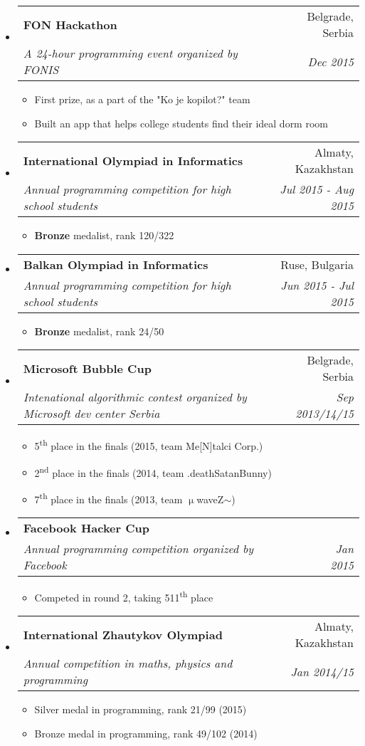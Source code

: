 \documentclass[letterpaper,11pt]{article}
\makeatletter
\newcommand{\resitem}[1]{\item #1 \vspace{-2pt}} %
\newcommand{\ressubheading}[4]{
\begin{tabular*}{6.5in}{l@{\cftdotfill{\cftsecdotsep}\extracolsep{\fill}}r} %
    \textbf{#1} & #2 \\
    \textit{#3} & \textit{#4} \\
\end{tabular*}\vspace{0pt}} %
\makeatother
\begin{document}
\begin{itemize}

\item \ressubheading{FON Hackathon}{Belgrade, Serbia}{A 24-hour programming event organized by FONIS}{Dec 2015}
\begin{itemize}
  \resitem{First prize, as a part of the "Ko je kopilot?" team}
  \resitem{Built an app that helps college students find their ideal dorm room}
\end{itemize}

\item \ressubheading{International Olympiad in Informatics}{Almaty, Kazakhstan}{Annual programming competition for high school students}{Jul 2015 - Aug 2015}
\begin{itemize}
  \resitem{\textbf{Bronze} medalist, rank 120/322}
\end{itemize}

\item \ressubheading{Balkan Olympiad in Informatics}{Ruse, Bulgaria}{Annual programming competition for high school students}{Jun 2015 - Jul 2015}
\begin{itemize}
  \resitem{\textbf{Bronze} medalist, rank 24/50}
\end{itemize}

\item \ressubheading{Microsoft Bubble Cup}{Belgrade, Serbia}{Intenational algorithmic contest organized by Microsoft dev center Serbia}{Sep 2013/14/15}
\begin{itemize}
  \resitem{5\textsuperscript{th} place in the finals (2015, team Me[N]talci Corp.)}
  \resitem{2\textsuperscript{nd} place in the finals (2014, team .deathSatanBunny)}
  \resitem{7\textsuperscript{th} place in the finals (2013, team $\upmu$waveZ$\sim$)}
\end{itemize}

\item \ressubheading{Facebook Hacker Cup}{}{Annual programming competition organized by Facebook}{Jan 2015}
\begin{itemize}
  \resitem{Competed in round 2, taking 511\textsuperscript{th} place}
\end{itemize}

\item \ressubheading{International Zhautykov Olympiad}{Almaty, Kazakhstan}{Annual competition in maths, physics and programming}{Jan 2014/15}
\begin{itemize}
  \resitem{Silver medal in programming, rank 21/99 (2015)}
  \resitem{Bronze medal in programming, rank 49/102 (2014)}
\end{itemize}


\end{itemize}
\end{document}
